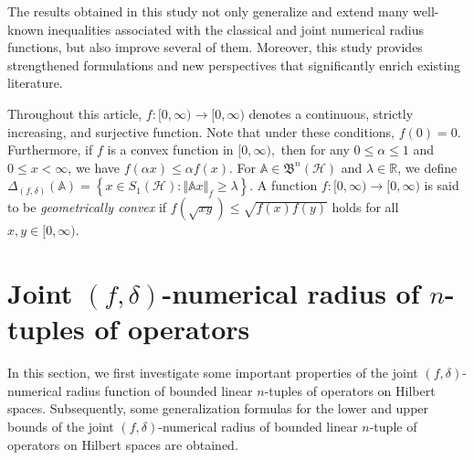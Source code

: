 \documentclass[12pt]{article}
\begin{document}
The results obtained in this study not only generalize and extend many well-known inequalities associated with the classical and joint numerical radius functions, but also improve several of them. Moreover, this study provides strengthened formulations and new perspectives that significantly enrich existing literature.

Throughout this article, $ f:[0,\infty)\rightarrow [0,\infty) $ denotes a continuous, strictly increasing, and surjective function.  Note that under these conditions, $ f(0)=0$. Furthermore, if $ f $ is a convex function in $ [0,\infty ), $ then for any $ 0\leq \alpha \leq 1$ and $0\leq x < \infty$, we have $ f(\alpha x )\leq \alpha f(x)$. For $ \mathbb{A}\in \mathfrak{B}^{n}(\mathcal{H})$ and $\lambda\in \mathbb{R} $, we define
\(
\Delta_{(f,\delta)}(\mathbb{A}) = \left\lbrace x\in S_{1}(\mathcal{H}): \Vert \mathbb{A}x \Vert_{f}\geq\lambda\right\rbrace.
\)
A function $f : [0,\infty) \to [0,\infty)$ is said to be \emph{geometrically convex} if
\(
f(\sqrt{xy}) \le \sqrt{f(x)f(y)}
\)
holds for all $x,y \in [0,\infty)$.



\section{Joint \texorpdfstring{$(f,\delta)$}{(f,delta)}-numerical radius of \texorpdfstring{$n$}{n}-tuples of operators}
\label{Sec:2}

In this section, we first investigate some important  properties of the joint $(f,\delta)$-numerical radius function of bounded linear $n$-tuples of operators on Hilbert spaces. Subsequently, some generalization formulas
for the lower and upper bounds of the joint $(f,\delta)$-numerical radius of bounded linear $n$-tuple of operators on Hilbert spaces are obtained.
\end{document}
